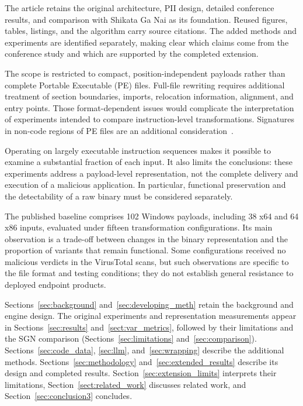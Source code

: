 \documentclass[runningheads]{llncs}
\begin{document}
The article retains the original architecture, PII design, detailed
conference results, and comparison with Shikata Ga Nai as its foundation.
Reused figures, tables, listings, and the algorithm carry source citations.
The added methods and experiments are identified separately, making clear
which claims come from the conference study and which are supported by
the completed extension.

The scope is restricted to compact, position-independent payloads rather than complete Portable Executable (PE) files. Full-file rewriting requires additional treatment of section boundaries, imports, relocation information, alignment, and entry points. Those format-dependent issues would complicate the interpretation of experiments intended to compare instruction-level transformations. Signatures in non-code regions of PE files are an additional consideration~\cite{sigdetPEnoncode}.

Operating on largely executable instruction sequences makes it possible to examine a substantial fraction of each input. It also limits the conclusions: these experiments address a payload-level representation, not the complete delivery and execution of a malicious application. In particular, functional preservation and the detectability of a raw binary must be considered separately.

The published baseline comprises 102 Windows payloads, including 38 x64 and 64 x86 inputs, evaluated under fifteen transformation configurations. Its main observation is a trade-off between changes in the binary representation and the proportion of variants that remain functional. Some configurations received no malicious verdicts in the VirusTotal scans, but such observations are specific to the file format and testing conditions; they do not establish general resistance to deployed endpoint products.

Sections~\ref{sec:background} and~\ref{sec:developing_meth} retain
the background and engine design. The original experiments and
representation measurements appear in Sections~\ref{sec:results}
and~\ref{sect:var_metrics}, followed by their limitations and the SGN
comparison (Sections~\ref{sec:limitations} and~\ref{sec:comparison}).
Sections~\ref{sec:code_data}, \ref{sec:llm}, and~\ref{sec:wrapping}
describe the additional methods. Sections~\ref{sec:methodology}
and~\ref{sec:extended_results} describe its design and completed results.
Section~\ref{sec:extension_limits} interprets their limitations,
Section~\ref{sect:related_work} discusses related work, and
Section~\ref{sec:conclusion3} concludes.
\end{document}
